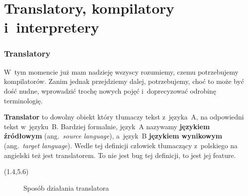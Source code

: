 \documentclass[10pt,t]{beamer}
\begin{document}










\section{Translatory, kompilatory i~interpretery}



\begin{frame}
  \frametitle{Translatory}

  \vspace{-0.75em}


  W~tym momencie już mam nadzieję wszyscy rozumiemy, czemu potrzebujemy
  kompilatorów. Zanim jednak przejdziemy dalej, potrzebujemy, choć to może
  być dość nudne, wprowadzić trochę nowych pojęć i~doprecyzować odrobinę
  terminologię.

  \textbf{Translator} to dowolny obiekt który tłumaczy tekst z~języka~A,
  na odpowiedni tekst w~języku~B. Bardziej formalnie, język~A nazywamy
  \textbf{językiem źródłowym} (ang.~\textit{source language}), a~język~B
  \textbf{językiem wynikowym} (ang.~\textit{target language}).
  Wedle tej definicji człowiek tłumaczący z~polskiego na angielski też
  jest translatorem. To nie jest bug tej definicji, to jest jej feature.




  \begin{textblock}{10.1}(1.4,5.6)

    \begin{figure}

      \label{fig:Translator-01}



      \caption{Sposób działania translatora}


    \end{figure}

  \end{textblock}

\end{frame}
\end{document}
